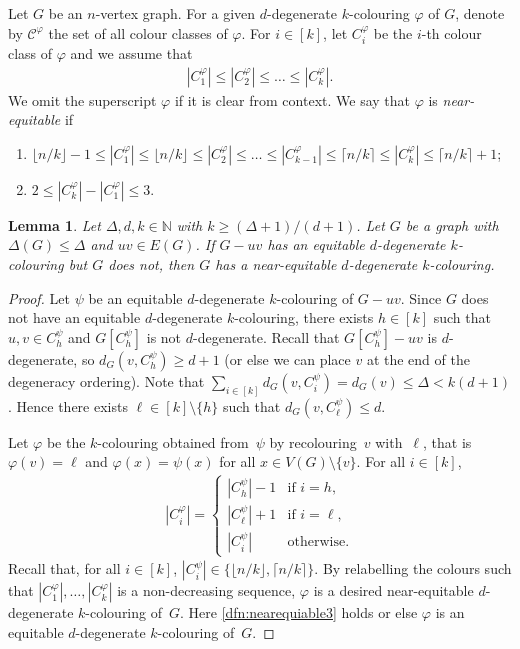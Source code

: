 \documentclass[11pt]{article}
\theoremstyle{plain}
\newtheorem{lem}[thm]{Lemma}
\numberwithin{equation}{section}
\begin{document}
Let $G$ be an $n$-vertex graph.
For a given   $d$-degenerate $k$-colouring $\varphi$ of $G$, denote by  $\mathcal{C}^\varphi$ the set of all colour classes of $\varphi$.
For $i\in [k]$, let $C_i^\varphi$ be the $i$-th colour class of $\varphi$ and we assume that
\begin{align*}
|C_1^\varphi| \le |C_2^\varphi| \le \ldots \le |C_k^\varphi|.
\end{align*}
We omit the superscript $\varphi$ if it is clear from context.
We say that $\varphi$ is \emph{near-equitable} if
	\begin{enumerate}[label={\rm(E\arabic*)}]
		\item $\lfloor n/k \rfloor -1 \le |C_1^\varphi| \le \lfloor n/k \rfloor\le |C_2^\varphi| \le \ldots\le |C_{k-1}^\varphi| \le \lceil n/k \rceil  \le |C_k^\varphi| \le \lceil n/k \rceil +1$;\ \label{dfn:nearequiable2}
		\item $2 \le |C_k^\varphi| -|C_1^\varphi|  \le 3 $. \label{dfn:nearequiable3}
	\end{enumerate}




	\begin{lem}\label{lem:induction-setting-up}
	Let $\Delta,d,k \in \mathbb{N}$ with  $k \ge (\Delta+1)/(d+1)$.
	Let $G$ be a graph with $\Delta(G)\leq\Delta$ and $uv \in E(G)$.
	If  $G-uv$ has an equitable $d$-degenerate $k$-colouring but $G$ does not,  then $G$ has a near-equitable $d$-degenerate $k$-colouring.
\end{lem}

\begin{proof}
	Let $\psi$ be an equitable $d$-degenerate  $k$-colouring of $G-uv$.
	Since $G$ does not have an equitable $d$-degenerate $k$-colouring, there exists $h \in [k]$ such that $u, v\in C_h^\psi$ and $G[C_h^\psi]$ is not $d$-degenerate.
	Recall that $G[C_h^\psi] -uv$ is  $d$-degenerate, so $d_{G} (v, C_h^\psi) \ge d+1$ (or else we can place $v$ at the end of the degeneracy ordering).
	Note that $\sum_{i \in [k]} d_{G}(v, C_i^\psi) = d_{G}(v) \le \Delta < k(d+1)$.
	Hence there exists $\ell\in [k] \setminus \{h\}$ such that $d_G(v, C_\ell^\psi) \le d$.
	
	Let $\varphi$ be the $k$-colouring obtained from~$\psi$ by recolouring~$v$ with~$\ell$, that is $ \varphi (v) = \ell$ and $\varphi (x) = \psi(x)$ for all $ x \in V(G) \setminus \{v\}$.
	For all $i \in [k]$,
	\begin{align*}
	|C_i^\varphi| =
	\begin{cases}
	  |C_h^\psi| - 1 & \text{if $i = h$,}\\
	  |C_\ell^\psi| + 1 & \text{if $i = \ell$,}\\
	  |C_i^\psi|& \text{otherwise}.
	\end{cases}
	\end{align*}
	Recall that, for all $i \in [k]$, $|C_i^\psi| \in  \{ \lfloor n/k \rfloor, \lceil n/k \rceil\}$.
	By relabelling the colours such that $|C_1^\varphi|,\ldots, |C_k^\varphi|$ is a non-decreasing sequence, $\varphi$ is a desired near-equitable $d$-degenerate $k$-colouring of~$G$.
	Here \ref{dfn:nearequiable3} holds or else $\varphi$ is an equitable $d$-degenerate $k$-colouring of~$G$.
\end{proof}
\end{document}
